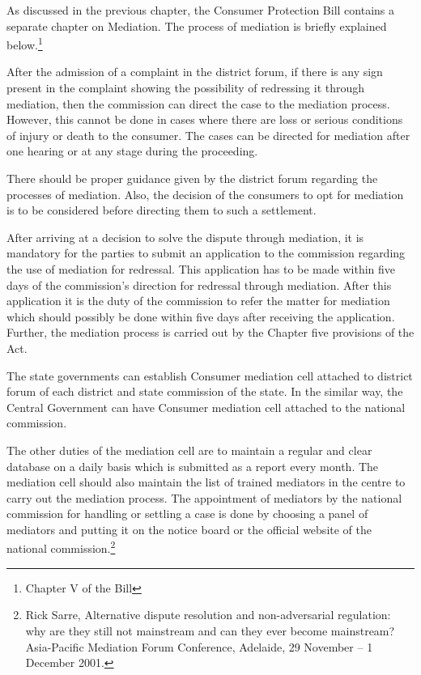 \begin{multicols}{2}
\vspace{-.2cm}

\noi
As discussed in the previous chapter, the Consumer Protection Bill contains a separate chapter
on Mediation. The process of mediation is briefly explained below.\footnote{Chapter V of the Bill}

\noi
After the admission of a complaint in the district forum, if there is any sign present in the
complaint showing the possibility of redressing it through mediation, then the commission can
direct the case to the mediation process. However, this cannot be done in cases where there are
loss or serious conditions of injury or death to the consumer. The cases can be directed for
mediation after one hearing or at any stage during the proceeding.

\noi
There should be proper guidance given by the district forum regarding the processes of
mediation. Also, the decision of the consumers to opt for mediation is to be considered before
directing them to such a settlement.

\vspace{.1cm}

\noi
After arriving at a decision to solve the dispute through mediation, it is mandatory for the
parties to submit an application to the commission regarding the use of mediation for redressal.
This application has to be made within five days of the commission’s direction for redressal
through mediation. After this application it is the duty of the commission to refer the matter for
mediation which should possibly be done within five days after receiving the application.
Further, the mediation process is carried out by the Chapter five provisions of the Act.

\vspace{.1cm}

\noi
The state governments can establish Consumer mediation cell attached to district forum of each
district and state commission of the state. In the similar way, the Central Government can have
Consumer mediation cell attached to the national commission.

\newpage

\noi
The other duties of the mediation cell are to maintain a regular and clear database on a daily
basis which is submitted as a report every month. The mediation cell should also maintain the
list of trained mediators in the centre to carry out the mediation process. The appointment of
mediators by the national commission for handling or settling a case is done by choosing a
panel of mediators and putting it on the notice board or the official website of the national
commission.\footnote{Rick Sarre, Alternative dispute resolution and non-adversarial regulation: why are they still not mainstream and can they ever become mainstream? Asia-Pacific Mediation Forum Conference, Adelaide, 29 November – 1 December 2001.}


\end{multicols}
